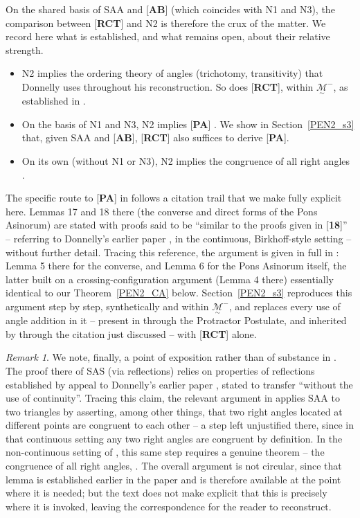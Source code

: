\documentclass[11pt,a4paper]{article}
\theoremstyle{definition}
\theoremstyle{remark}
\newtheorem{rem}[thm]{Remark}
\numberwithin{equation}{section}
\newcommand{\MG}{\underset{\sim}{\mathcal{M}}}
\begin{document}
On the shared basis of SAA and [\textbf{AB}] (which coincides with N1 and N3), the comparison
between [\textbf{RCT}] and N2 is therefore the crux of the matter. We record here what is
established, and what remains open, about their relative strength.

\begin{itemize}
\item N2 implies the ordering theory of angles (trichotomy, transitivity) that Donnelly uses
throughout his reconstruction. So does [\textbf{RCT}], within $\MG^{-}$, as established in
\cite{Volpe2026I}.
\item On the basis of N1 and N3, N2 implies [\textbf{PA}] \cite[Lemmas~17--18]{Donnelly2025}.
We show in Section~\ref{PEN2_s3} that, given SAA and [\textbf{AB}], [\textbf{RCT}] also
suffices to derive [\textbf{PA}].
\item On its own (without N1 or N3), N2 implies the congruence of all right angles
\cite[Lemma~19]{Donnelly2025}.
\end{itemize}

The specific route to [\textbf{PA}] in \cite{Donnelly2025} follows a citation trail that we
make fully explicit here. Lemmas 17 and 18 there (the converse and direct forms of the Pons
Asinorum) are stated with proofs said to be ``similar to the proofs given in
[\textbf{18}]'' -- referring to Donnelly's earlier paper \cite{Donnelly2010}, in the
continuous, Birkhoff-style setting -- without further detail. Tracing this reference, the
argument is given in full in \cite{Donnelly2010}: Lemma 5 there for the converse, and Lemma 6
for the Pons Asinorum itself, the latter built on a crossing-configuration argument (Lemma 4
there) essentially identical to our Theorem~\ref{PEN2_CA} below. Section~\ref{PEN2_s3}
reproduces this argument step by step, synthetically and within $\MG^{-}$, and replaces every
use of angle addition in it -- present in \cite{Donnelly2010} through the Protractor
Postulate, and inherited by \cite{Donnelly2025} through the citation just discussed -- with
[\textbf{RCT}] alone.

\begin{rem}
We note, finally, a point of exposition rather than of substance in \cite{Donnelly2025}. The
proof there of SAS (via reflections) relies on properties of reflections established by
appeal to Donnelly's earlier paper \cite{Donnelly2010}, stated to transfer ``without the use
of continuity''. Tracing this claim, the relevant argument in \cite{Donnelly2010} applies
SAA to two triangles by asserting, among other things, that two right angles located at
different points are congruent to each other -- a step left unjustified there, since in that
continuous setting any two right angles are congruent by definition. In the non-continuous
setting of \cite{Donnelly2025}, this same step requires a genuine theorem -- the congruence
of all right angles, \cite[Lemma~19]{Donnelly2025}. The overall argument is not circular,
since that lemma is established earlier in the paper and is therefore available at the point
where it is needed; but the text does not make explicit that this is precisely where it is
invoked, leaving the correspondence for the reader to reconstruct.
\end{rem}
\end{document}
